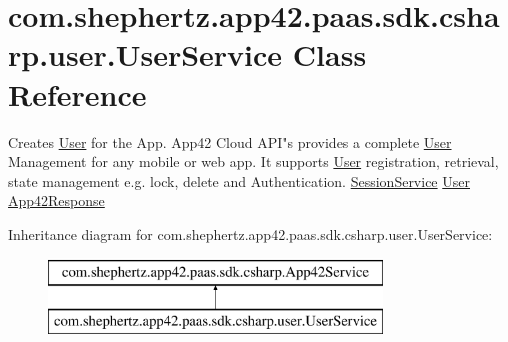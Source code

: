 \hypertarget{classcom_1_1shephertz_1_1app42_1_1paas_1_1sdk_1_1csharp_1_1user_1_1_user_service}{\section{com.\+shephertz.\+app42.\+paas.\+sdk.\+csharp.\+user.\+User\+Service Class Reference}
\label{classcom_1_1shephertz_1_1app42_1_1paas_1_1sdk_1_1csharp_1_1user_1_1_user_service}
}


Creates \hyperlink{classcom_1_1shephertz_1_1app42_1_1paas_1_1sdk_1_1csharp_1_1user_1_1_user}{User} for the App. App42 Cloud A\+P\+I"s provides a complete \hyperlink{classcom_1_1shephertz_1_1app42_1_1paas_1_1sdk_1_1csharp_1_1user_1_1_user}{User} Management for any mobile or web app. It supports \hyperlink{classcom_1_1shephertz_1_1app42_1_1paas_1_1sdk_1_1csharp_1_1user_1_1_user}{User} registration, retrieval, state management e.\+g. lock, delete and Authentication. \hyperlink{}{Session\+Service} \hyperlink{classcom_1_1shephertz_1_1app42_1_1paas_1_1sdk_1_1csharp_1_1user_1_1_user_service}{User} \hyperlink{classcom_1_1shephertz_1_1app42_1_1paas_1_1sdk_1_1csharp_1_1_app42_response}{App42\+Response}  


Inheritance diagram for com.\+shephertz.\+app42.\+paas.\+sdk.\+csharp.\+user.\+User\+Service\+:\begin{figure}[H]
\begin{center}
\leavevmode
\includegraphics[height=2.000000cm]{classcom_1_1shephertz_1_1app42_1_1paas_1_1sdk_1_1csharp_1_1user_1_1_user_service}
\end{center}
\end{figure}
